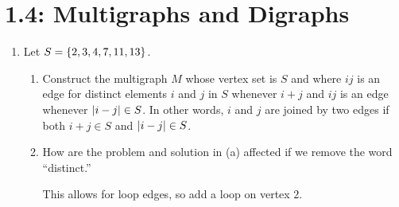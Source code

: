 \documentclass[letterpaper,12pt,fleqn]{article}
\begin{document}
\section*{1.4: Multigraphs and Digraphs}

\begin{enumerate}[start=29]
\item Let \(S=\{2,3,4,7,11,13\}\).
  \begin{enumerate}
    \item Construct the multigraph \(M\) whose vertex set is \(S\) and where \(ij\) is an edge for distinct
      elements \(i\) and \(j\) in \(S\) whenever \(i+j\) and \(ij\) is an edge whenever \(\lvert i-j\rvert\in S\).  In
      other words, \(i\) and \(j\) are joined by two edges if both \(i+j\in S\) and \(\lvert i-j\rvert\in S\).

      \bigskip

      \begin{center}
      \end{center}

    \item How are the problem and solution in (a) affected if we remove the word ``distinct.''

      This allows for loop edges, so add a loop on vertex \(2\).

      \bigskip

      \begin{center}
      \end{center}
  \end{enumerate}


\end{enumerate}
\end{document}

